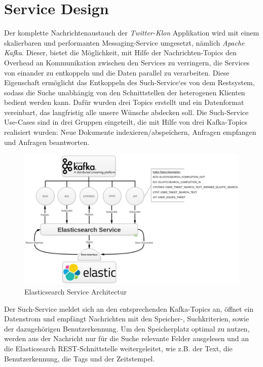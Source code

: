 \section{Service Design}
Der komplette Nachrichtenaustauch der \textit{Twitter-Klon} Applikation wird mit einem skalierbaren und performanten Messaging-Service umgesetzt, nämlich \textit{Apache Kafka}. Dieser, bietet die Möglichkeit, mit Hilfe der Nachrichten-Topics den Overhead an Kommunikation zwischen den Services zu verringern, die Services von einander zu entkoppeln und die Daten parallel zu verarbeiten.
Diese Eigenschaft ermöglicht das Entkoppeln des Such-Service‘es von dem Restsystem, sodass die Suche unabhängig von den Schnittstellen der heterogenen Klienten bedient werden kann. 
Dafür wurden drei Topics erstellt und ein Datenformat vereinbart, das langfristig alle unsere Wünsche abdecken soll. Die Such-Service Use-Cases sind in drei Gruppen eingeteilt, die mit Hilfe von drei Kafka-Topics realisiert wurden: Neue Dokumente indexieren/abspeichern, Anfragen empfangen und Anfragen beantworten.
\begin{figure}[htbp!]
  \includegraphics[scale=0.8]{material/architecture/Elasticsearch.png}
  \caption{Elasticsearch Service Architectur}
  \label{fig:ESA}
\end{figure}

Der Such-Service meldet sich an den entsprechenden Kafka-Topics an, öffnet ein Datenstrom und empfängt Nachrichten mit den Speicher-, Suchkriterien, sowie der dazugehörigen Benutzerkennung. Um den Speicherplatz optimal zu nutzen, werden aus der Nachricht nur für die Suche relevante Felder ausgelesen und an die Elasticsearch REST-Schnittstelle weitergeleitet, wie z.B. der Text, die Benutzerkennung, die Tags und der Zeitstempel.  

